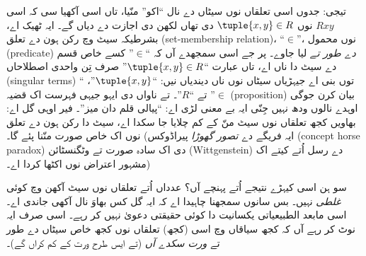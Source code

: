\documentclass[../../../include/open-logic-section]{subfiles}
\begin{document}
تیجی: جدوں اسی تعلقاں نوں سیٹاں دے نال ``اکو'' منّیا، تاں اسی آکھیا سی کہ
اسی $Rxy$ نوں $\tuple{x,y} \in R$ دی تھاں لکھن دی اجازت دے دیاں گے۔ ایہ
ٹھیک اے، بشرطیکہ سیٹ وچ رکن ہون دے تعلق (set-membership relation)، ``$\in$''، نوں محمول (predicate) \emph{دے طور تے}
لیا جاوے۔ پر جے اسی سمجھدے آں کہ ``$\in$'' کسے خاص قسم دے سیٹ دا ناں اے،
تاں عبارت ``$\tuple{x,y} \in R$'' صرف تِن واحدی اصطلاحاں (singular terms) توں بنی اے
جیہڑیاں سیٹاں نوں ناں دیندیاں نیں: ``$\tuple{x,y}$''، ``$\in$'' تے ``$R$''۔ تے
ناواں دی ایہو جیہی فہرست اک قضیہ (proposition) بیان کرن جوگی اوہدے نالوں ودھ نہیں جِنّی
ایہ بے معنی لڑی اے: ``پیالی قلم دان میز''۔ فیر اوہی گل اے: بھاویں کجھ
تعلقاں نوں سیٹ منّ کے کم چلایا جا سکدا اے، سیٹ دا رکن ہون دے تعلق نوں اک
خاص صورت منّنا پئے گا۔ (ایہ فریگے دے \emph{تصور گھوڑا} پیراڈوکس (concept horse paradox) دی اک
سادہ صورت تے وٹگنسٹائن (Wittgenstein) دے رسل اُتے کیتے اک مشہور اعتراض نوں اکٹھا کردا اے۔)

سو ہن اسی کیہڑے نتیجے اُتے پہنچے آں؟ عدداں اُتے تعلقاں نوں سیٹ آکھن وچ
کوئی \emph{غلطی} نہیں۔ بس سانوں سمجھنا چاہیدا اے کہ ایہ گل کس بھاوَ نال
آکھی جاندی اے۔ اسی مابعد الطبیعیاتی یکسانیت دا کوئی حقیقتی دعویٰ نہیں کر
رہے۔ اسی صرف ایہ نوٹ کر رہے آں کہ کجھ سیاقاں وچ اسی (کجھ) تعلقاں نوں کجھ
خاص سیٹاں دے طور تے \emph{ورت سکدے آں} (تے ایس طرح ورت کے کم کراں گے)۔
\end{document}
